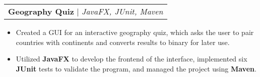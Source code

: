 \documentclass[letterpaper,11pt]{article}
\makeatletter
\newcommand{\resumeProjectHeading}[2]{
    \begin{tabular*}{0.97\textwidth}[t]{l@{\extracolsep{\fill}}}
      \textbf{#1} $\vert$ \textit{#2} 
    \end{tabular*}\vspace{-4pt}
}
\newcommand{\resumeItemListStart}{\begin{itemize}[noitemsep]\vspace{-4pt}}
\newcommand{\resumeItemListEnd}{\end{itemize}}
\makeatother
\begin{document}
    \resumeProjectHeading{Geography Quiz}{JavaFX, JUnit, Maven}
      \resumeItemListStart
        \item {Created a GUI for an interactive geography quiz, which asks the user to pair countries with continents and converts results to binary for later use.}
        \item {Utilized \textbf{JavaFX} to develop the frontend of the interface, implemented six \textbf{JUnit} tests to validate the program, and managed the project using \textbf{Maven}.}
      \resumeItemListEnd
\end{document}
